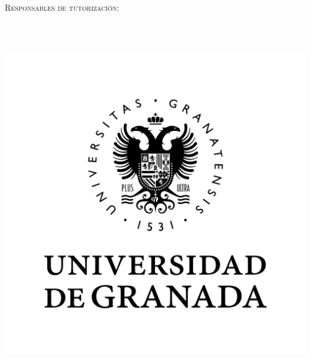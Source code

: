\begin{titlepage}
    \begin{addmargin}[-1cm]{-1cm}
    \begin{center}
        \large

        \hfill

        \vfill


        {\centering\bfseries\LARGE \myTitle \par}

        \myName\\\bigskip

        \small
		
		{\scshape Responsables de tutorización: \par}
         
        \myProf \\[5pt]
        \myOtherProf \\ \bigskip


        \includegraphics[scale = 0.5, angle = 0]{imgs/ugr.png} \\ \medskip


\end{center}
\end{addmargin}
\end{titlepage}

